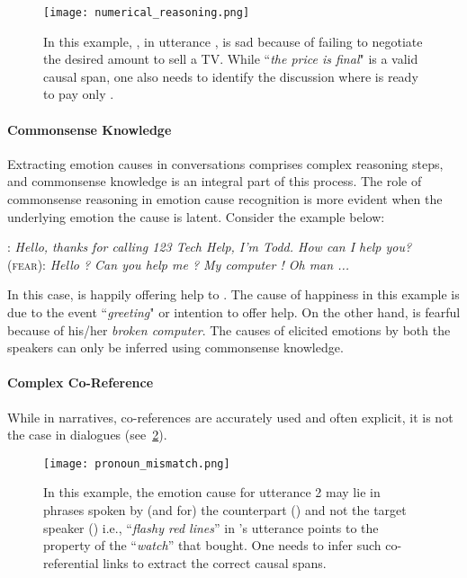 \documentclass[smallextended]{svjour3}
\newcommand\emo[1]{\textsc{#1}}
\newcommand\0{\hphantom{0}}
\begin{document}
\begin{figure}[t!]
    \centering
    \texttt{[image: numerical\_reasoning.png]}
    \caption{{In this example, , in utterance , is sad because of failing to negotiate the desired amount to sell a TV. While ``\textit{the price is final}" is a valid causal span, one also needs to identify the discussion where  is ready to pay only .}}
    \label{fig:numerical_reasoning}
\end{figure}

\paragraph{Commonsense Knowledge} Extracting emotion causes in conversations comprises complex reasoning steps, and commonsense knowledge is an integral part of this process. The role of commonsense reasoning in emotion cause recognition is more evident when the underlying emotion the cause is latent. Consider the example below:
\begin{exe}
\ex { (\emo{happy})}: \textit{Hello, thanks for calling 123 Tech Help, I'm Todd. How can I help you?}\\
{ (\emo{fear})}: \textit{Hello ? Can you help me ? My computer ! Oh man ...}
\label{ex:latent}
\end{exe}
In this case,  is happily offering help to . The cause of happiness in this example is due to the event ``\textit{greeting}" or intention to offer help. On the other hand,  is fearful because of his/her \textit{broken computer}. The causes of elicited emotions by both the speakers can only be inferred using commonsense knowledge.

\paragraph{Complex Co-Reference} While in narratives, co-references are accurately used and often explicit, it is not the case in dialogues (see~\cref{fig:pronoun_mismatch}).  

\begin{figure}[t!]
    \centering
    \texttt{[image: pronoun\_mismatch.png]}
    \caption{{In this example, the emotion cause for utterance 2 may lie in phrases spoken by (and for) the counterpart () and not the target speaker () i.e., ``\textit{flashy red lines}'' in 's utterance points to the property of the ``\textit{watch}'' that  bought. One needs to infer such co-referential links to extract the correct causal spans.}}
    \label{fig:pronoun_mismatch}
\end{figure}
\end{document}
